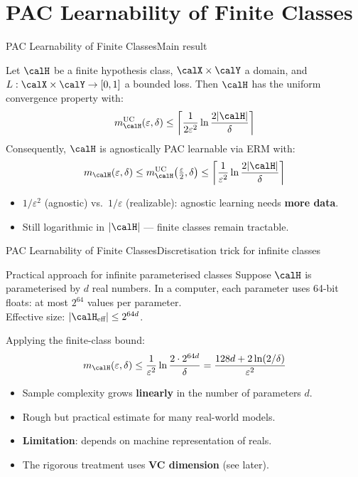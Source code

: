 \section{PAC Learnability of Finite Classes}

\begin{frame}{PAC Learnability of Finite Classes}{Main result}
  \begin{mytheorem}
    Let $\calH$ be a finite hypothesis class, $\calX\times\calY$ a domain, and
    $L:\calX\times\calY\to[0,1]$ a bounded loss. Then $\calH$ has the uniform convergence
    property with:
    \[
      m_\calH^{\text{UC}}(\varepsilon,\delta)
        \leq \left\lceil\frac{1}{2\varepsilon^2}\ln\frac{2|\calH|}{\delta}\right\rceil
    \]
    Consequently, $\calH$ is agnostically PAC learnable via ERM with:
    \[
      m_\calH(\varepsilon,\delta)
        \leq m_\calH^{\text{UC}}\!\left(\tfrac{\varepsilon}{2},\delta\right)
        \leq \left\lceil\frac{1}{\varepsilon^2}\ln\frac{2|\calH|}{\delta}\right\rceil
    \]
  \end{mytheorem}
  \begin{itemize}
    \item $1/\varepsilon^2$ (agnostic) vs.\ $1/\varepsilon$ (realizable): agnostic learning
          needs \textbf{more data}.
    \item Still logarithmic in $|\calH|$ — finite classes remain tractable.
  \end{itemize}
\end{frame}

\begin{frame}{PAC Learnability of Finite Classes}{Discretisation trick for infinite classes}
  \begin{block}{Practical approach for infinite parameterised classes}
    Suppose $\calH$ is parameterised by $d$ real numbers. In a computer, each parameter
    uses 64-bit floats: at most $2^{64}$ values per parameter.\\[4pt]
    Effective size: $|\calH_{\text{eff}}| \leq 2^{64d}$.
  \end{block}
  \bigskip
  Applying the finite-class bound:
  \[
    m_\calH(\varepsilon,\delta)
    \leq \frac{1}{\varepsilon^2}\ln\frac{2\cdot 2^{64d}}{\delta}
    = \frac{128d + 2\ln(2/\delta)}{\varepsilon^2}
  \]
  \begin{itemize}
    \item Sample complexity grows \textbf{linearly} in the number of parameters $d$.
    \item Rough but practical estimate for many real-world models.
    \item \textbf{Limitation}: depends on machine representation of reals.
    \item The rigorous treatment uses \textbf{VC dimension} (see later).
  \end{itemize}
\end{frame}

